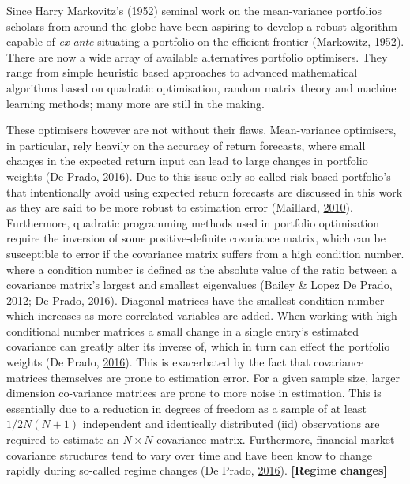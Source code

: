 \documentclass[11pt,preprint, authoryear]{elsarticle}
\numberwithin{equation}{section}
\numberwithin{figure}{section}
\numberwithin{table}{section}
\begin{document}
Since Harry Markovitz's (1952) seminal work on the mean-variance
portfolios scholars from around the globe have been aspiring to develop
a robust algorithm capable of \emph{ex ante} situating a portfolio on
the efficient frontier (Markowitz,
\protect\hyperlink{ref-markowitz}{1952}). There are now a wide array of
available alternatives portfolio optimisers. They range from simple
heuristic based approaches to advanced mathematical algorithms based on
quadratic optimisation, random matrix theory and machine learning
methods; many more are still in the making.

These optimisers however are not without their flaws. Mean-variance
optimisers, in particular, rely heavily on the accuracy of return
forecasts, where small changes in the expected return input can lead to
large changes in portfolio weights (De Prado,
\protect\hyperlink{ref-lopez}{2016}). Due to this issue only so-called
risk based portfolio's that intentionally avoid using expected return
forecasts are discussed in this work as they are said to be more robust
to estimation error (Maillard,
\protect\hyperlink{ref-maillard2010}{2010}). Furthermore, quadratic
programming methods used in portfolio optimisation require the inversion
of some positive-definite covariance matrix, which can be susceptible to
error if the covariance matrix suffers from a high condition number.
where a condition number is defined as the absolute value of the ratio
between a covariance matrix's largest and smallest eigenvalues (Bailey
\& Lopez De Prado, \protect\hyperlink{ref-lopez2012}{2012}; De Prado,
\protect\hyperlink{ref-lopez}{2016}). Diagonal matrices have the
smallest condition number which increases as more correlated variables
are added. When working with high conditional number matrices a small
change in a single entry's estimated covariance can greatly alter its
inverse of, which in turn can effect the portfolio weights (De Prado,
\protect\hyperlink{ref-lopez}{2016}). This is exacerbated by the fact
that covariance matrices themselves are prone to estimation error. For a
given sample size, larger dimension co-variance matrices are prone to
more noise in estimation. This is essentially due to a reduction in
degrees of freedom as a sample of at least \(1/2N(N+1)\) independent and
identically distributed (iid) observations are required to estimate an
\(N\times N\) covariance matrix. Furthermore, financial market
covariance structures tend to vary over time and have been know to
change rapidly during so-called regime changes (De Prado,
\protect\hyperlink{ref-lopez}{2016}). \textbf{{[}Regime changes{]}}
\end{document}
